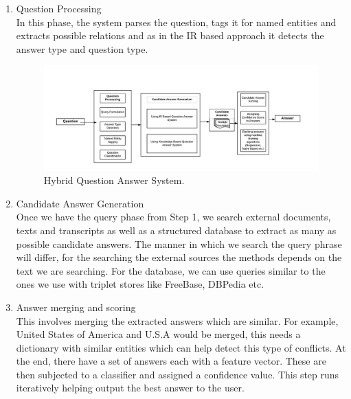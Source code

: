 \begin{enumerate}

\item Question Processing \\
In this phase, the system parses the question, tags it for named entities and extracts possible relations and as in the IR based approach it detects the answer type and question type.

\begin{figure}[htb]
\centering
\includegraphics[scale=0.8]{images/Hybrid_QA.jpg}
\caption{Hybrid Question Answer System.} 
\label{fig:Hybrid_QA}
\end{figure}

\break
\item Candidate Answer Generation \\
Once we have the query phase from Step 1, we search external documents, texts and transcripts as well as a structured database to extract as many as possible candidate answers. The manner in which we search the query phrase will differ, for the searching the external sources the methods depends on the text we are searching. For the database, we can use queries similar to the ones we use with triplet stores like FreeBase, DBPedia etc.

\item Answer merging and scoring \\
This involves merging the extracted answers which are similar. For example, United States of America and U.S.A would be merged, this needs a dictionary with similar entities which can help detect this type of conflicts. At the end, there have a set of answers each with a feature vector. These are then subjected to a classifier and assigned a confidence value. This step runs iteratively helping output the best answer to the user.

 \end{enumerate}